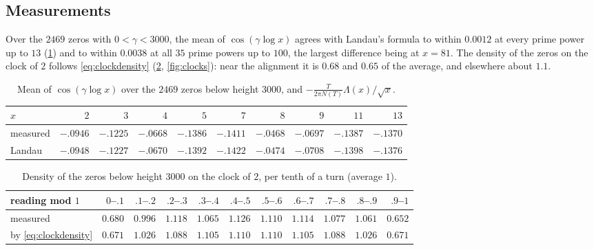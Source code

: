 \documentclass[11pt]{article}
\theoremstyle{definition}\newtheorem{definition}[theorem]{Definition}
\theoremstyle{remark}\newtheorem{remark}[theorem]{Remark}
\theoremstyle{definition}\newtheorem{axiom}{Axiom}
\begin{document}
\subsection{Measurements}

Over the $2469$ zeros with $0<\gamma<3000$, the mean of $\cos(\gamma\log x)$ agrees with Landau's formula to within $0.0012$ at every prime power up to $13$ (\cref{tab:landau}) and to within $0.0038$ at all $35$ prime powers up to $100$, the largest difference being at $x=81$. The density of the zeros on the clock of $2$ follows \eqref{eq:clockdensity} (\cref{tab:density}, \cref{fig:clocks}): near the alignment it is $0.68$ and $0.65$ of the average, and elsewhere about $1.1$.

\begin{table}[!htbp]\centering\small
\begin{tabular}{@{}lrrrrrrrrr@{}}\toprule
$x$ & $2$ & $3$ & $4$ & $5$ & $7$ & $8$ & $9$ & $11$ & $13$\\\midrule
measured & $-.0946$ & $-.1225$ & $-.0668$ & $-.1386$ & $-.1411$ & $-.0468$ & $-.0697$ & $-.1387$ & $-.1370$\\
Landau & $-.0948$ & $-.1227$ & $-.0670$ & $-.1392$ & $-.1422$ & $-.0474$ & $-.0708$ & $-.1398$ & $-.1376$\\\bottomrule
\end{tabular}
\caption{Mean of $\cos(\gamma\log x)$ over the $2469$ zeros below height $3000$, and $-\frac T{2\pi N(T)}\Lambda(x)/\sqrt x$.}\label{tab:landau}
\end{table}

\begin{table}[!htbp]\centering\small
\setlength{\tabcolsep}{4.5pt}
\begin{tabular}{@{}lrrrrrrrrrr@{}}\toprule
reading mod $1$ & $0$--$.1$ & $.1$--$.2$ & $.2$--$.3$ & $.3$--$.4$ & $.4$--$.5$ & $.5$--$.6$ & $.6$--$.7$ & $.7$--$.8$ & $.8$--$.9$ & $.9$--$1$\\\midrule
measured & $0.680$ & $0.996$ & $1.118$ & $1.065$ & $1.126$ & $1.110$ & $1.114$ & $1.077$ & $1.061$ & $0.652$\\
by \eqref{eq:clockdensity} & $0.671$ & $1.026$ & $1.088$ & $1.105$ & $1.110$ & $1.110$ & $1.105$ & $1.088$ & $1.026$ & $0.671$\\\bottomrule
\end{tabular}
\caption{Density of the zeros below height $3000$ on the clock of $2$, per tenth of a turn (average $1$).}\label{tab:density}
\end{table}
\end{document}
